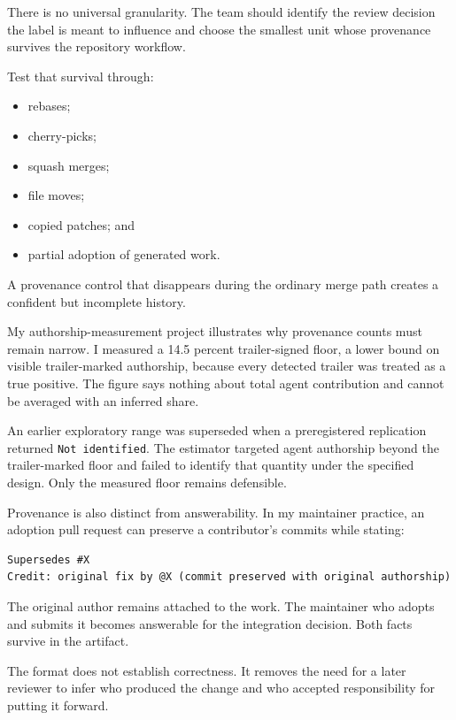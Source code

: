 There is no universal granularity. The team should identify the review decision the label is meant to influence and choose the smallest unit whose provenance survives the repository workflow.

Test that survival through:

\begin{itemize}
\tightlist
\item
  rebases;
\item
  cherry-picks;
\item
  squash merges;
\item
  file moves;
\item
  copied patches; and
\item
  partial adoption of generated work.
\end{itemize}

A provenance control that disappears during the ordinary merge path creates a confident but incomplete history.

My authorship-measurement project illustrates why provenance counts must remain narrow. I measured a 14.5 percent trailer-signed floor, a lower bound on visible trailer-marked authorship, because every detected trailer was treated as a true positive. The figure says nothing about total agent contribution and cannot be averaged with an inferred share.

An earlier exploratory range was superseded when a preregistered replication returned \texttt{Not\ identified}. The estimator targeted agent authorship beyond the trailer-marked floor and failed to identify that quantity under the specified design. Only the measured floor remains defensible.

Provenance is also distinct from answerability. In my maintainer practice, an adoption pull request can preserve a contributor's commits while stating:

\begin{verbatim}
Supersedes #X
Credit: original fix by @X (commit preserved with original authorship)
\end{verbatim}

The original author remains attached to the work. The maintainer who adopts and submits it becomes answerable for the integration decision. Both facts survive in the artifact.

The format does not establish correctness. It removes the need for a later reviewer to infer who produced the change and who accepted responsibility for putting it forward.

